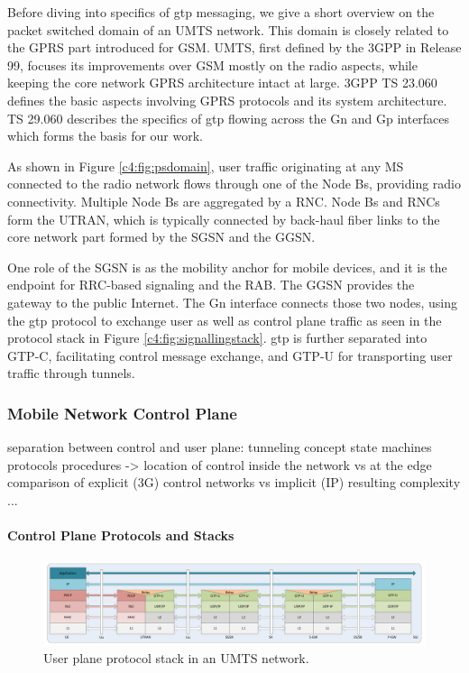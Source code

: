 Before diving into specifics of \gls{gtp} messaging, we give a short overview on the packet switched domain of an \gls{UMTS} network. This domain is closely related to the \gls{GPRS} part introduced for \acrshort{GSM}. \gls{UMTS}, first defined by the \gls{3GPP} in Release 99, focuses its improvements over \gls{GSM} mostly on the radio aspects, while keeping the core network \gls{GPRS} architecture intact at large. \gls{3GPP} \gls{TS} 23.060 \cite{3gpp.23.060} defines the basic aspects involving \gls{GPRS} protocols and its system architecture. \gls{TS} 29.060 \cite{3gpp.29.060} describes the specifics of \gls{gtp} flowing across the Gn and Gp interfaces which forms the basis for our work.

As shown in Figure \ref{c4:fig:psdomain}, user traffic originating at any \gls{MS} connected to the radio network flows through one of the Node Bs, providing radio connectivity. Multiple Node Bs are aggregated by a \gls{RNC}. Node Bs and \glspl{RNC} form the \gls{UTRAN}, which is typically connected by back-haul fiber links to the core network part formed by the \gls{SGSN} and the \gls{GGSN}.

One role of the \gls{SGSN} is as the mobility anchor for mobile devices, and it is the endpoint for \gls{RRC}-based signaling and the \gls{RAB}. The \gls{GGSN} provides the gateway to the public Internet. The Gn interface connects those two nodes, using the \gls{gtp} protocol to exchange user as well as control plane traffic as seen in the protocol stack in Figure \ref{c4:fig:signallingstack}. \gls{gtp} is further separated into GTP-C, facilitating control message exchange, and GTP-U for transporting user traffic through tunnels.


\subsubsection{Mobile Network Control Plane}

separation between control and user plane: tunneling concept
state machines
protocols
procedures -> location of control inside the network vs at the edge
comparison of explicit (3G) control networks vs implicit (IP)
resulting complexity
...


\paragraph{Control Plane Protocols and Stacks}




\begin{figure}[htb]
	\centering
	\includegraphics[width=1.0\textwidth]{images/3g-userplane.pdf}
	\caption{User plane protocol stack in an UMTS network.}
	\label{c4:fig:3gpp-umtsuserplane}
\end{figure}

